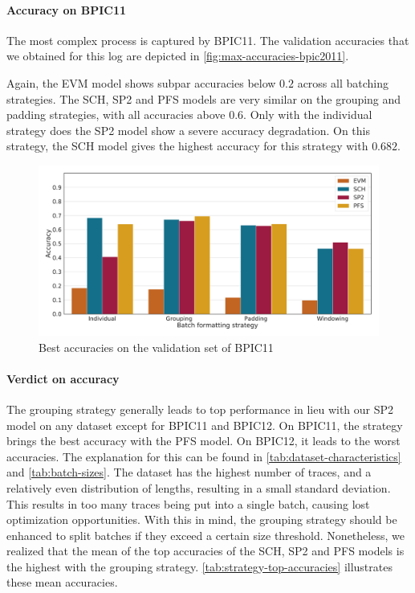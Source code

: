 \paragraph{Accuracy on BPIC11}
The most complex process is captured by BPIC11.
The validation accuracies that we obtained for this log are depicted in \autoref{fig:max-accuracies-bpic2011}.

Again, the EVM model shows subpar accuracies below $0.2$ across all batching strategies.
The SCH, SP2 and PFS models are very similar on the grouping and padding strategies, with all accuracies above $0.6$.
Only with the individual strategy does the SP2 model show a severe accuracy degradation.
On this strategy, the SCH model gives the highest accuracy for this strategy with $0.682$.

\begin{figure}[!htb]
    \centering
    \includegraphics[width=\textwidth]{gfx/bpic2011/accuracies.pdf}
    \caption{Best accuracies on the validation set of BPIC11}
    \label{fig:max-accuracies-bpic2011}
\end{figure}

\paragraph{Verdict on accuracy}
The grouping strategy generally leads to top performance in lieu with our SP2 model on any dataset except for BPIC11 and BPIC12. On BPIC11, the strategy brings the best accuracy with the PFS model. On BPIC12, it leads to the worst accuracies. The explanation for this can be found in \autoref{tab:dataset-characteristics} and \autoref{tab:batch-sizes}. The dataset has the highest number of traces, and a relatively even distribution of lengths, resulting in a small standard deviation. This results in too many traces being put into a single batch, causing lost optimization opportunities. With this in mind, the grouping strategy should be enhanced to split batches if they exceed a certain size threshold. Nonetheless, we realized that the mean of the top accuracies of the SCH, SP2 and PFS models is the highest with the grouping strategy. \autoref{tab:strategy-top-accuracies} illustrates these mean accuracies.

